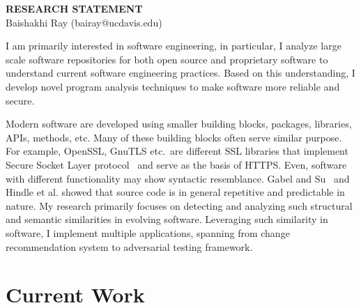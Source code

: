 \documentclass[a4paper, 11pt]{article}
\begin{document}
\thispagestyle{fancy}
\lhead{}
\rhead{}


\pagestyle{fancy}
\rhead{\grayline{\thepage/\totalpages{}}}

\begin{small}

\begin{center}
{\large \bf RESEARCH STATEMENT}\\
\vspace*{0.1cm}
{\normalsize Baishakhi Ray (bairay@ucdavis.edu)}
\end{center}


I am primarily interested in software engineering, in particular, I analyze large scale software repositories 
for both open source and proprietary software to understand current software engineering practices. 
Based on this understanding, I develop novel program analysis techniques to make software more reliable and
 secure.

Modern software are developed using smaller building blocks, \eg  packages, libraries, APIs, methods, etc. 
Many of these building blocks often serve similar purpose. For example, OpenSSL, GnuTLS etc.~are 
different SSL libraries that implement Secure Socket Layer protocol~\cite{rfc5280} and serve as
the basis of HTTPS. Even, software with different functionality may show syntactic resemblance. 
Gabel and Su~\cite{Gabel2010:uniqueness} and Hindle et al.\cite{Hindle:2012} showed that source code 
is in general repetitive and predictable in nature. My research primarily focuses on detecting and analyzing 
such structural and semantic similarities in evolving software. Leveraging such similarity in software, I implement 
multiple applications, spanning from change recommendation system to adversarial testing framework.

\section*{\small Current Work}


\end{small}
\end{document}
